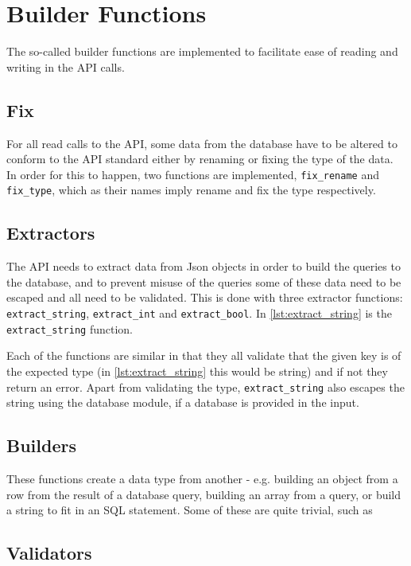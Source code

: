 \section{Builder Functions}
The so-called builder functions are implemented to facilitate ease of reading and writing in the API calls.

\subsection{Fix}
For all read calls to the API, some data from the database have to be altered to conform to the API standard either by renaming or fixing the type of the data. In order for this to happen, two functions are implemented,  \lstinline|fix_rename| and  \lstinline|fix_type|, which as their names imply rename and fix the type respectively. 

\subsection{Extractors}
The API needs to extract data from Json objects in order to build the queries to the database, and to prevent misuse of the queries some of these data need to be escaped and all need to be validated. This is done with three extractor functions: \lstinline|extract_string|, \lstinline|extract_int| and \lstinline|extract_bool|. In \autoref{lst:extract_string} is the \lstinline|extract_string| function.



Each of the functions are similar in that they all validate that the given key is of the expected type (in \autoref{lst:extract_string} this would be string) and if not they return an error. Apart from validating the type, \lstinline|extract_string| also escapes the string using the database module, if a database is provided in the input. 

\subsection{Builders}
These functions create a data type from another - e.g. building an object from a row from the result of a database query, building an array from a query, or build a string to fit in an SQL statement. Some of these are quite trivial, such as 

\subsection{Validators}